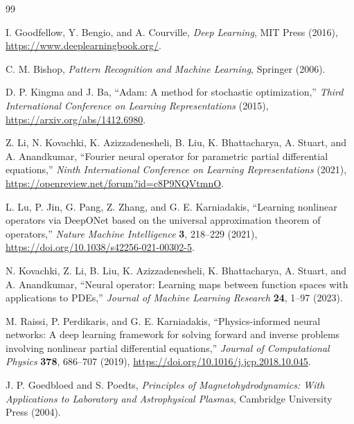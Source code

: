 \documentclass[11pt]{article}
\begin{document}
\clearpage
\begin{thebibliography}{99}

I. Goodfellow, Y. Bengio, and A. Courville,
\emph{Deep Learning},
MIT Press (2016),
\url{https://www.deeplearningbook.org/}.

C. M. Bishop,
\emph{Pattern Recognition and Machine Learning},
Springer (2006).

D. P. Kingma and J. Ba,
``Adam: A method for stochastic optimization,''
\emph{Third International Conference on Learning Representations} (2015),
\url{https://arxiv.org/abs/1412.6980}.

Z. Li, N. Kovachki, K. Azizzadenesheli, B. Liu, K. Bhattacharya,
A. Stuart, and A. Anandkumar,
``Fourier neural operator for parametric partial differential equations,''
\emph{Ninth International Conference on Learning Representations} (2021),
\url{https://openreview.net/forum?id=c8P9NQVtmnO}.

L. Lu, P. Jin, G. Pang, Z. Zhang, and G. E. Karniadakis,
``Learning nonlinear operators via DeepONet based on the universal approximation theorem of operators,''
\emph{Nature Machine Intelligence} \textbf{3}, 218--229 (2021),
\url{https://doi.org/10.1038/s42256-021-00302-5}.

N. Kovachki, Z. Li, B. Liu, K. Azizzadenesheli, K. Bhattacharya,
A. Stuart, and A. Anandkumar,
``Neural operator: Learning maps between function spaces with applications to PDEs,''
\emph{Journal of Machine Learning Research} \textbf{24}, 1--97 (2023).

M. Raissi, P. Perdikaris, and G. E. Karniadakis,
``Physics-informed neural networks: A deep learning framework for solving forward and inverse problems involving nonlinear partial differential equations,''
\emph{Journal of Computational Physics} \textbf{378}, 686--707 (2019),
\url{https://doi.org/10.1016/j.jcp.2018.10.045}.

J. P. Goedbloed and S. Poedts,
\emph{Principles of Magnetohydrodynamics: With Applications to Laboratory and Astrophysical Plasmas},
Cambridge University Press (2004).

\end{thebibliography}
\end{document}

